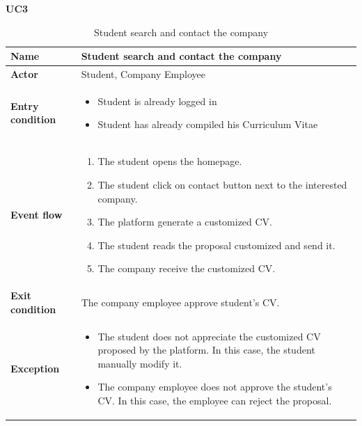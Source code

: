     \textbf{UC3}
    \nopagebreak
    \begin{table}[H]
    \centering
    \begin{tabular}{|l|p{11.9cm}|}
        \hline
        \textbf{Name}            & Student search and contact the company \\\hline
        \textbf{Actor}           & Student, Company Employee         \\\hline
        \textbf{Entry condition} &
        \begin{itemize}
              \item Student is already logged in
              \item Student has already compiled his Curriculum Vitae
        \end{itemize}                                        \\\hline
        \textbf{Event flow}      &
        \begin{enumerate}[label=\arabic*.]
              \item The student opens the homepage.
              \item The student click on contact button next to the interested company.
              \item The platform generate a customized CV.
              \item The student reads the proposal customized and send it.
              \item The company receive the customized CV.
        \end{enumerate}            \\\hline
        \textbf{Exit condition}  & The company employee approve student's CV.\\\hline
        \textbf{Exception}       &  
        \begin{itemize}
              \item The student does not appreciate the customized CV proposed by the platform. In this case, the student manually modify it.
              \item The company employee does not approve the student's CV. In this case, the employee can reject the proposal.  
        \end{itemize} 
        \\\hline
    \end{tabular}
    \caption{Student search and contact the company}
    \label{table:Student search and contact the company}
    \end{table}

